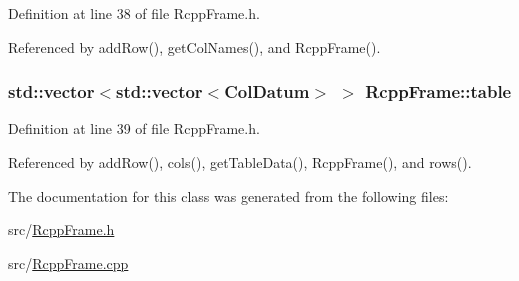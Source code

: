 Definition at line 38 of file RcppFrame.h.

Referenced by addRow(), getColNames(), and RcppFrame().\hypertarget{classRcppFrame_a4de0bda5c0df650b2447a4c029af0302}{
\subsubsection[{table}]{\setlength{\rightskip}{0pt plus 5cm}std::vector$<$std::vector$<${\bf ColDatum}$>$ $>$ {\bf RcppFrame::table}}}
\label{classRcppFrame_a4de0bda5c0df650b2447a4c029af0302}


Definition at line 39 of file RcppFrame.h.

Referenced by addRow(), cols(), getTableData(), RcppFrame(), and rows().

The documentation for this class was generated from the following files:\begin{DoxyCompactItemize}
\item 
src/\hyperlink{RcppFrame_8h}{RcppFrame.h}\item 
src/\hyperlink{RcppFrame_8cpp}{RcppFrame.cpp}\end{DoxyCompactItemize}
